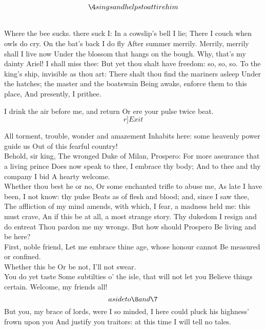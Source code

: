 \documentclass[11pt]{book}
\begin{document}
	\[\4 sings and helps to attire him\]

{ \Locus \personae {}
\4 \\
   \Locus \textus {+3em} \Forma {}
	Where the bee sucks. there suck I:
	In a cowslip's bell I lie;
	There I couch when owls do cry.
	On the bat's back I do fly
	After summer merrily.
	Merrily, merrily shall I live now
	Under the blossom that hangs on the bough.
}
\1	Why, that's my dainty Ariel! I shall miss thee:
	But yet thou shalt have freedom: so, so, so.
	To the king's ship, invisible as thou art:
	There shalt thou find the mariners asleep
	Under the hatches; the master and the boatswain
	Being awake, enforce them to this place,
	And presently, I prithee.

\4	I drink the air before me, and return
	Or ere your pulse twice beat. \[r]Exit\]

\9	All torment, trouble, wonder and amazement
	Inhabits here: some heavenly power guide us
	Out of this fearful country! \\

\1	Behold, sir king,
	The wronged Duke of Milan, Prospero:
	For more assurance that a living prince
	Does now speak to thee, I embrace thy body;
	And to thee and thy company I bid
	A hearty welcome.  \\

\6	                  Whether thou best he or no,
	Or some enchanted trifle to abuse me,
	As late I have been, I not know: thy pulse
	Beats as of flesh and blood; and, since I saw thee,
	The affliction of my mind amends, with which,
	I fear, a madness held me: this must crave,
	An if this be at all, a most strange story.
	Thy dukedom I resign and do entreat
	Thou pardon me my wrongs. But how should Prospero
	Be living and be here? \\

\1	First, noble friend,
	Let me embrace thine age, whose honour cannot
	Be measured or confined. \\

\9	Whether this be
	Or be not, I'll not swear. \\

\1	You do yet taste
	Some subtilties o' the isle, that will not let you
	Believe things certain. Welcome, my friends all!
	\[aside to \8 and \7\]
	But you, my brace of lords, were I so minded,
	I here could pluck his highness' frown upon you
	And justify you traitors: at this time
	I will tell no tales. \\
\end{document}
